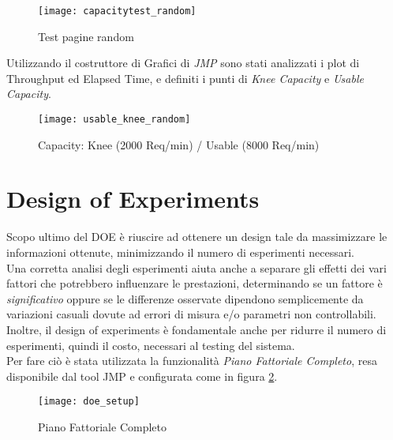 \begin{figure}[!htbp]
  \centering
  \texttt{[image: capacitytest\_random]}
  \caption{Test pagine random}
  \label{random_page_summary_report}
\end{figure}

Utilizzando il costruttore di Grafici di \textit{JMP} sono stati analizzati i plot
di Throughput ed Elapsed Time, e definiti i punti di \textit{Knee Capacity} e
\textit{Usable Capacity}.\\

\begin{figure}[!htbp]
  \centering
  \texttt{[image: usable\_knee\_random]}
  \caption{Capacity: Knee (2000 Req/min) / Usable (8000 Req/min)}
\end{figure}

\clearpage

\section{Design of Experiments}
Scopo ultimo del DOE è riuscire ad ottenere un design tale da
massimizzare le informazioni ottenute, minimizzando il numero di esperimenti
necessari.\\
Una corretta analisi degli esperimenti aiuta anche a separare gli effetti dei
vari fattori che potrebbero influenzare le prestazioni, determinando se un fattore
è \textit{significativo} oppure se le differenze osservate dipendono semplicemente
da variazioni casuali dovute ad errori di misura e/o parametri non controllabili.\\
Inoltre, il design of experiments è fondamentale anche per ridurre il numero di
esperimenti, quindi il costo, necessari al testing del sistema.\\
Per fare ciò è stata utilizzata la funzionalità \textit{Piano Fattoriale Completo},
resa disponibile dal tool JMP e configurata come in figura \ref{piano_fattoriale_completo}.\\

\begin{figure}[!htbp]
  \centering
  \texttt{[image: doe\_setup]}
  \caption{Piano Fattoriale Completo}
  \label{piano_fattoriale_completo}
\end{figure}

\clearpage

